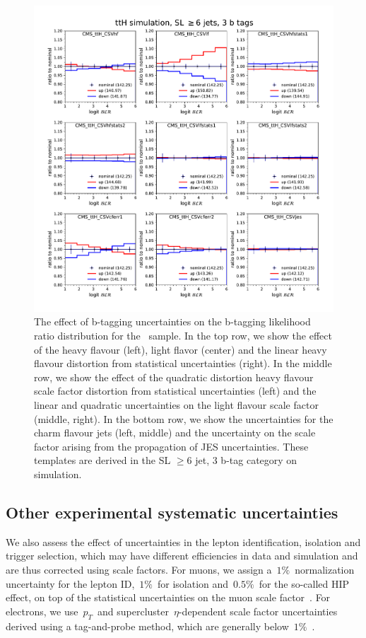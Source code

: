 \begin{figure}
\begin{centering}
\includegraphics[width = 1.0\textwidth]{figures/tth/sl_jge6_t3_blr_unc.pdf}
\caption[The effect of b-tagging uncertainties on the b-tagging likelihood ratio.]{The effect of b-tagging uncertainties on the b-tagging likelihood ratio distribution for the \ttHbb~sample. In the top row, we show the effect of the heavy flavour (left), light flavor (center) and the linear heavy flavour distortion from statistical uncertainties (right). In the middle row, we show the effect of the quadratic distortion heavy flavour scale factor distortion from statistical uncertainties (left) and the linear and quadratic uncertainties on the light flavour scale factor (middle, right). In the bottom row, we show the uncertainties for the charm flavour jets (left, middle) and the uncertainty on the scale factor arising from the propagation of JES uncertainties. These templates are derived in the SL $\geq6$ jet, 3 b-tag category on \ttH simulation.}
\label{fig:tth_btag_unc}
\end{centering}
\end{figure}

\subsection{Other experimental systematic uncertainties}
We also assess the effect of uncertainties in the lepton identification, isolation and trigger selection, which may have different efficiencies in data and simulation and are thus corrected using scale factors. For muons, we assign a~$1\%$~normalization uncertainty for the lepton ID,~$1\%$~for isolation and~$0.5\%$~for the so-called HIP effect, on top of the statistical uncertainties on the muon scale factor~\cite{CMS:2017_mu_sf}. For electrons, we use~$p_T$~and supercluster~$\eta$-dependent scale factor uncertainties derived using a tag-and-probe method, which are generally below~$1\%$~\cite{CMS:2017_ele_sf}.

